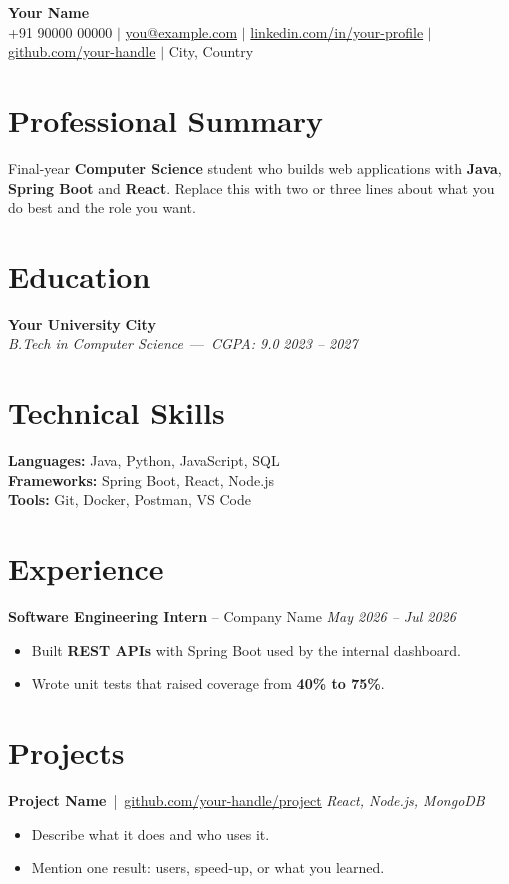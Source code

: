 \documentclass[10pt,a4paper]{article}
\begin{document}
\begin{center}
{\Huge\bfseries Your Name}\\[5pt]
{\small +91 90000 00000 $|$ \href{mailto:you@example.com}{you@example.com} $|$ \href{https://linkedin.com/in/your-profile}{linkedin.com/in/your-profile} $|$ \href{https://github.com/your-handle}{github.com/your-handle} $|$ City, Country}
\end{center}

\section{Professional Summary}
Final-year \textbf{Computer Science} student who builds web applications with \textbf{Java}, \textbf{Spring Boot} and \textbf{React}. Replace this with two or three lines about what you do best and the role you want.

\section{Education}
\textbf{Your University} \hfill \textbf{City}\\
\textit{B.Tech in Computer Science} \,---\, \textit{CGPA: 9.0} \hfill \textit{2023 -- 2027}

\section{Technical Skills}
\textbf{Languages:} Java, Python, JavaScript, SQL\\
\textbf{Frameworks:} Spring Boot, React, Node.js\\
\textbf{Tools:} Git, Docker, Postman, VS Code

\section{Experience}
  \textbf{Software Engineering Intern} -- Company Name \hfill \textit{May 2026 -- Jul 2026}\\[-9pt]
  \begin{itemize}
    \item Built \textbf{REST APIs} with Spring Boot used by the internal dashboard.
    \item Wrote unit tests that raised coverage from \textbf{40\% to 75\%}.
  \end{itemize}
  \vspace{3pt}

\section{Projects}
  \textbf{Project Name} \,|\, \href{https://github.com/your-handle/project}{\underline{github.com/your-handle/project}} \hfill \textit{\small React, Node.js, MongoDB}\\[-9pt]
  \begin{itemize}
    \item Describe what it does and who uses it.
    \item Mention one result: users, speed-up, or what you learned.
  \end{itemize}
  \vspace{3pt}
\end{document}
